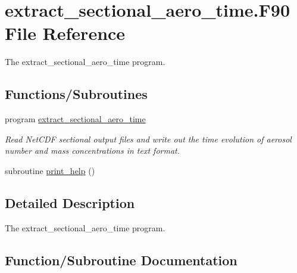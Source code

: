 \hypertarget{extract__sectional__aero__time_8_f90}{}\section{extract\+\_\+sectional\+\_\+aero\+\_\+time.\+F90 File Reference}
\label{extract__sectional__aero__time_8_f90}


The extract\+\_\+sectional\+\_\+aero\+\_\+time program.  


\subsection*{Functions/\+Subroutines}
\begin{DoxyCompactItemize}
\item 
program \mbox{\hyperlink{extract__sectional__aero__time_8_f90_a52fe413f54fe986b26a1ff4014cb49be}{extract\+\_\+sectional\+\_\+aero\+\_\+time}}
\begin{DoxyCompactList}\small\item\em Read Net\+C\+DF sectional output files and write out the time evolution of aerosol number and mass concentrations in text format. \end{DoxyCompactList}\item 
subroutine \mbox{\hyperlink{extract__sectional__aero__time_8_f90_ac967c6f80c18fab9e5125dfca31e89fe}{print\+\_\+help}} ()
\end{DoxyCompactItemize}


\subsection{Detailed Description}
The extract\+\_\+sectional\+\_\+aero\+\_\+time program. 



\subsection{Function/\+Subroutine Documentation}
\mbox{\label{extract__sectional__aero__time_8_f90_a52fe413f54fe986b26a1ff4014cb49be}} 
